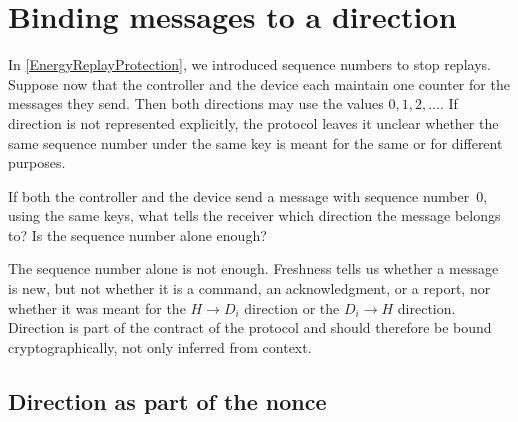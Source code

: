 \section{Binding messages to a direction}
\label{EnergyDirectionBinding}


In \cref{EnergyReplayProtection}, we introduced sequence numbers to stop
replays.
Suppose now that the controller and the device each maintain one counter for
the messages they send.
Then both directions may use the values \(0, 1, 2, \ldots\).
If direction is not represented explicitly, the protocol leaves it unclear
whether the same sequence number under the same key is meant for the same or
for different purposes.

\begin{exercise}
  If both the controller and the device send a message with sequence
  number~\(0\), using the same keys, what tells the receiver which direction
  the message belongs to?
  Is the sequence number alone enough?
\end{exercise}

The sequence number alone is not enough.
Freshness tells us whether a message is new, but not whether it is a command,
an acknowledgment, or a report, nor whether it was meant for the
\(H \rightarrow D_i\) direction or the \(D_i \rightarrow H\) direction.
Direction is part of the contract of the protocol and should therefore be
bound cryptographically, not only inferred from context.

\subsection{Direction as part of the nonce}

